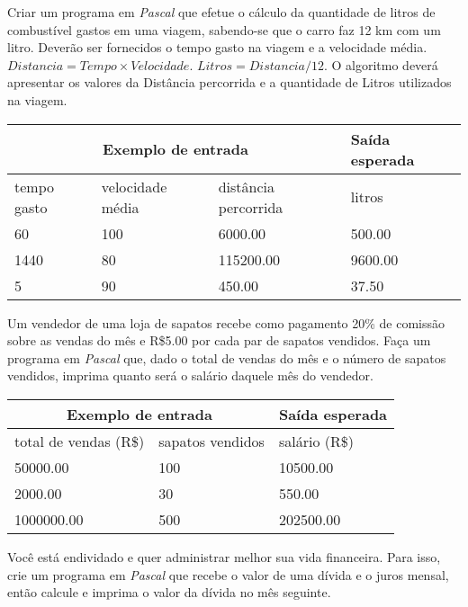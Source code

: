 \item Criar um programa em \emph{Pascal} que efetue o cálculo da quantidade de 
litros de combustível gastos em uma viagem, sabendo-se que o carro faz 12 km 
com um litro. Deverão ser fornecidos o tempo gasto na viagem e a velocidade 
média.  $Distancia = Tempo \times Velocidade$.  $Litros = Distancia / 12$.
O algoritmo deverá apresentar os valores da Distância percorrida e a 
quantidade de Litros utilizados na viagem.

\begin{center}
\begin{tabular}{|l|l|l|l|} \hline
\multicolumn{3}{|c|}{Exemplo de entrada} & Saída esperada \\ \hline
tempo gasto & velocidade média & distância percorrida & litros \\ \hline
60 & 100  & 6000.00 & 500.00             \\ \hline
1440 & 80 & 115200.00 & 9600.00           \\ \hline
5 & 90 & 450.00 & 37.50        \\ \hline
\end{tabular}
\end{center}

\item Um vendedor de uma loja de sapatos recebe como pagamento 20\% de comissão 
sobre as vendas do mês e R\$5.00 por cada par de sapatos vendidos. Faça
 um programa em \emph{Pascal} que, dado o 
total de vendas do mês e o número de sapatos vendidos, imprima quanto será o 
salário daquele mês do vendedor.

\begin{center}
\begin{tabular}{|l|l|l|} \hline
\multicolumn{2}{|c|}{Exemplo de entrada} & Saída esperada \\ \hline
total de vendas (R\$) & sapatos vendidos & salário (R\$) \\ \hline
50000.00 & 100 & 10500.00            \\ \hline
2000.00 & 30 & 550.00           \\ \hline
1000000.00 & 500 & 202500.00          \\ \hline
\end{tabular}
\end{center}

\item Você está endividado e quer administrar melhor sua vida financeira. 
Para isso, crie um programa em \emph{Pascal} que recebe o valor de uma dívida 
e o juros mensal, então calcule e imprima o valor da dívida no mês seguinte.

